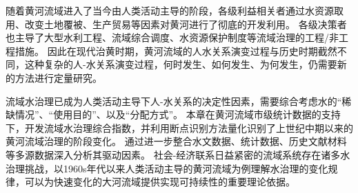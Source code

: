 随着黄河流域进入了当今由人类活动主导的阶段，各级利益相关者通过水资源取用、改变土地覆被、生产贸易等因素对黄河进行了彻底的开发利用。
各级决策者也主导了大型水利工程、流域综合调度、水资源保护制度等流域治理的工程/非工程措施。
因此在现代治黄时期，黄河流域的人水关系演变过程与历史时期截然不同，这种复杂的人-水关系演变过程，何时发生、如何发生、为何发生，仍需要新的方法进行定量研究。

流域水治理已成为人类活动主导下人-水关系的决定性因素，需要综合考虑水的“稀缺情况”、“使用目的”、以及“分配方式”。
本章在黄河流域市级统计数据的支持下，开发流域水治理综合指数，并利用断点识别方法量化识别了上世纪中期以来的黄河流域治理的阶段变化。
通过进一步整合水文数据、统计数据、历史文献材料等多源数据深入分析其驱动因素。
社会-经济联系日益紧密的流域系统存在诸多水治理挑战，以1960s年代以来人类活动主导的黄河流域为例理解水治理的变化规律，可以为快速变化的大河流域提供实现可持续性的重要理论依据。

